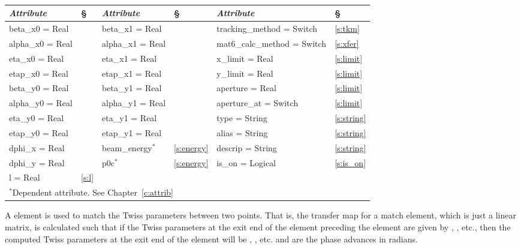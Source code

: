 {{\begin{center}
\tt
\begin{tabular}{|l|l||l|l||l|l|} \hline
  {\sl Attribute} & \S  & {\sl Attribute} & \S & {\sl Attribute} & \S \\ \hline
  beta\_x0  = Real &               & beta\_x1  = Real &                & tracking\_method = Switch   & \ref{s:tkm}    \\ \hline
  alpha\_x0 = Real &               & alpha\_x1 = Real &                & mat6\_calc\_method = Switch & \ref{s:xfer}   \\ \hline
  eta\_x0   = Real &               & eta\_x1   = Real &                & x\_limit = Real             & \ref{s:limit}  \\ \hline
  etap\_x0  = Real &               & etap\_x1  = Real &                & y\_limit = Real             & \ref{s:limit}  \\ \hline
  beta\_y0  = Real &               & beta\_y1  = Real &                & aperture = Real             & \ref{s:limit}  \\ \hline
  alpha\_y0 = Real &               & alpha\_y1 = Real &                & aperture\_at = Switch       & \ref{s:limit}  \\ \hline
  eta\_y0   = Real &               & eta\_y1   = Real &                & type = String               & \ref{s:string} \\ \hline
  etap\_y0  = Real &               & etap\_y1  = Real &                & alias = String              & \ref{s:string} \\ \hline
  dphi\_x   = Real &               & beam\_energy$^*$ & \ref{s:energy} & descrip = String            & \ref{s:string} \\ \hline
  dphi\_y   = Real &               & p0c$^*$          & \ref{s:energy} & is\_on = Logical            & \ref{s:is_on}  \\ \hline
  l         = Real & \ref{s:l}     &                  &                &                             &                \\ \hline
  \multicolumn{6}{l}{\small $^*$Dependent attribute. See Chapter~\ref{c:attrib}} \\
\end{tabular}
\end{center}
\toffset

A  element is used to match the Twiss parameters between two
points. That is, the transfer map for a match element, which is just a
linear matrix, is calculated such that if the Twiss parameters at the
exit end of the element preceding the  element are given by
, , etc., then the computed Twiss parameters
at the exit end of the  element will be ,
, etc.  and  are the phase advances
in radians.

}}
